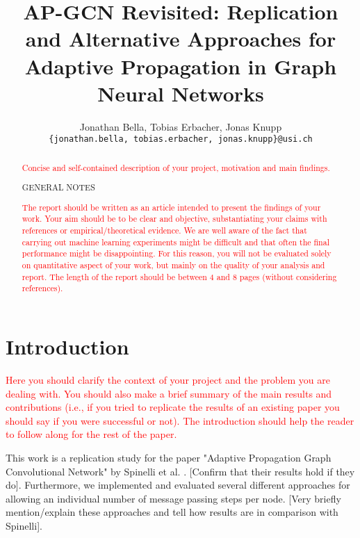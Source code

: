 \documentclass{gdl}
\begin{document}
\title{AP-GCN Revisited: Replication and Alternative Approaches for Adaptive Propagation in Graph Neural Networks}

\author{%
Jonathan Bella, Tobias Erbacher, Jonas Knupp\\
\texttt{\{jonathan.bella, tobias.erbacher, jonas.knupp\}@usi.ch}
}

\begin{abstract}
\textcolor{red}{Concise and self-contained description of your project, motivation and main findings.}

\begin{center}
    \sf\large\color{red} GENERAL NOTES
\end{center}

\textcolor{red}{The report should be written as an article intended to present the findings of your work. Your aim should be to be clear and objective, substantiating your claims with references or empirical/theoretical evidence.
We are well aware of the fact that carrying out machine learning experiments might be difficult and that often the final performance might be disappointing. For this reason, you will not be evaluated solely on quantitative aspect of your work, but mainly on the quality of your analysis and report.
The length of the report should be between 4 and 8 pages (without considering references).}

\end{abstract}

\maketitle

\section{Introduction}

\textcolor{red}{Here you should clarify the context of your project and the problem you are dealing with. You should also make a brief summary of the main results and contributions (i.e., if you tried to replicate the results of an existing paper you should say if you were successful or not). The introduction should help the reader to follow along for the rest of the paper.}

This work is a replication study for the paper "Adaptive Propagation Graph Convolutional Network" by Spinelli et al. \cite{spinelli2021}. [Confirm that their results hold if they do]. Furthermore, we implemented and evaluated several different approaches for allowing an individual number of message passing steps per node. [Very briefly mention/explain these approaches and tell how results are in comparison with Spinelli]. 
\end{document}
